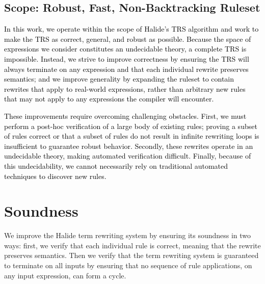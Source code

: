 \documentclass[acmsmall]{acmart}\settopmatter{}
\newcommand{\sak}[1]{\textcolor{olive}{\textit{[{#1} --SK]}}}
\newcommand{\modified}[1]{\textcolor{black}{{#1}}}
\begin{document}
\subsection{Scope: Robust, Fast, Non-Backtracking Ruleset}
\modified{In this work, we operate within the scope of Halide's TRS algorithm
  and work to make the TRS as correct, general, and robust as possible.  Because
  the space of expressions we consider constitutes an undecidable theory, a complete
  TRS is impossible.  Instead, we strive to improve correctness by ensuring the TRS
  will always terminate on any expression and that each individual rewrite
  preserves semantics; and we improve generality by expanding the ruleset to
  contain rewrites that apply to real-world expressions, rather than
  arbitrary new rules that may not apply to any expressions the compiler will encounter.}

\modified{These improvements require overcoming challenging obstacles.  First,
  we must perform a post-hoc verification of a large body of existing rules;
  proving a subset of rules correct or that a subset of rules do not result in infinite
  rewriting loops is insufficient to guarantee robust behavior.  Secondly,
  these rewrites operate in an undecidable theory, making automated verification
  difficult.  Finally, because of this undecidability, we cannot necessarily
  rely on traditional automated techniques to discover new rules.}

\section{Soundness}
\label{sec:soundness}

We improve the Halide term rewriting system by ensuring its soundness in
two ways: first, we verify that each individual rule is correct, meaning that the
rewrite preserves semantics. Then we verify that the term rewriting system is
guaranteed to terminate on all inputs by ensuring that no sequence of
rule applications, on any input expression, can form a cycle.
\end{document}

